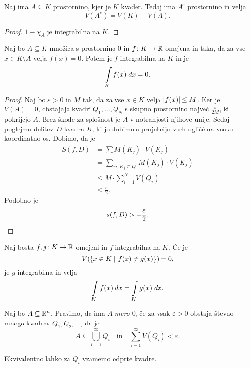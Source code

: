 \begin{trditev}
Naj ima $A \subseteq K$ prostornino, kjer je $K$ kvader. Tedaj ima
$A^\mathsf{c}$ prostornino in velja
\[
V(A^\mathsf{c}) = V(K) - V(A).
\]
\end{trditev}

\begin{proof}
$1 - \chi_A$ je integrabilna na $K$.
\end{proof}

\begin{trditev}
Naj bo $A \subseteq K$ množica s prostornino $0$ in
$f \colon K \to \mathbb{R}$ omejena in taka, da za vse
$x \in K \setminus A$ velja $f(x) = 0$. Potem je $f$ integrabilna
na $K$ in je
\[
\int\limits_K f(x)\;dx = 0.
\]
\end{trditev}

\begin{proof}
Naj bo $\varepsilon > 0$ in $M$ tak, da za vse $x \in K$ velja
$\left\lvert f(x)\right\rvert \leq M$. Ker je $V(A) = 0$, obstajajo kvadri
$Q_1,\dots,Q_N$ s skupno prostornino največ
$\frac{\varepsilon}{2M}$, ki pokrijejo $A$. Brez škode za splošnost
je $A$ v notranjosti njihove unije. Sedaj poglejmo delitev $D$
kvadra $K$, ki jo dobimo s projekcijo vseh oglišč na vsako
koordinatno os. Dobimo, da je
\begin{align*}
S(f,D) &=
\sum M(K_j) \cdot V(K_j)
\\
&= \sum_{\exists i \colon K_j \subseteq Q_i} M(K_j) \cdot V(K_j)
\\
&\leq M \cdot \sum_{i=1}^N V(Q_i)
\\
&< \frac{\varepsilon}{2}.
\end{align*}
Podobno je
\[
s(f,D) > -\frac{\varepsilon}{2}. \qedhere
\]
\end{proof}

\begin{posledica}
Naj bosta $f,g \colon K \to \mathbb{R}$ omejeni in $f$ integrabilna na $K$.
Če je
\[
V(\left\{x \in K~\middle\vert~f(x) \ne g(x)\right\}) = 0,
\]
je $g$ integrabilna in velja
\[
\int\limits_K f(x)\;dx = \int\limits_K g(x)\;dx.
\]
\end{posledica}

\begin{definicija}
Naj bo $A \subseteq \mathbb{R}^n$. Pravimo, da ima $A$
\emph{mero $0$}, če za vsak $\varepsilon > 0$
obstaja števno mnogo kvadrov $Q_1,Q_2,\dots$, da je
\[
A \subseteq \bigcup_{i=1}^\infty Q_i
\quad \text{in} \quad
\sum_{i=1}^\infty V(Q_i) < \varepsilon.
\]
\end{definicija}

\begin{opomba}
Ekvivalentno lahko za $Q_i$ vzamemo odprte kvadre.
\end{opomba}

